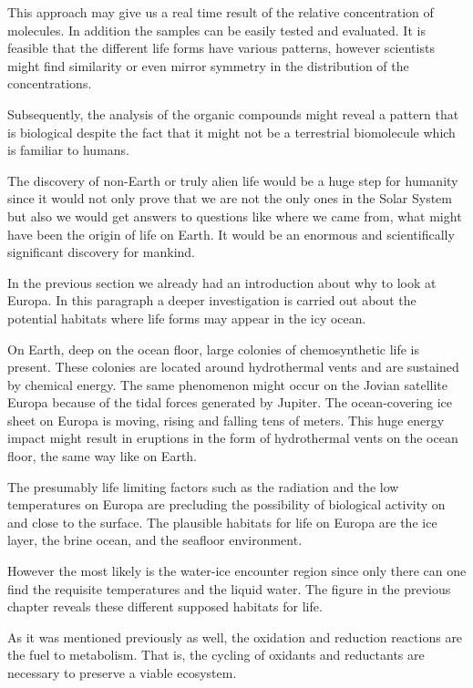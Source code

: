 This approach may give us a real time result of the relative concentration of molecules. In addition the samples can be easily tested and evaluated. 
It is feasible that the different life forms have various patterns, however scientists might find similarity or even mirror symmetry in the distribution of the concentrations. 

Subsequently, the analysis of the organic compounds might reveal a pattern that is biological despite the fact that it might not be a terrestrial biomolecule which is familiar to humans.

The discovery of non-Earth or truly alien life would be a huge step for humanity since it would not only prove that we are not the only ones in the Solar System but also we would get answers to questions like where we came from, what might have been the origin of life on Earth. It would be an enormous and scientifically significant discovery for mankind.

In the previous section we already had an introduction about why to look at Europa. In this paragraph a deeper investigation is carried out about the potential habitats where life forms may appear in the icy ocean.

On Earth, deep on the ocean floor, large colonies of chemosynthetic life is present. These colonies are located around hydrothermal vents and are sustained by chemical energy. 
The same phenomenon might occur on the Jovian satellite Europa because of the tidal forces generated by Jupiter. The ocean-covering ice sheet on Europa is moving, rising and falling tens of meters. This huge energy impact might result in eruptions in the form of hydrothermal vents on the ocean floor, the same way like on Earth.

The presumably life limiting factors such as the radiation and the low temperatures on Europa are precluding the possibility of biological activity on and close to the surface. The plausible habitats for life on Europa are the ice layer, the brine ocean, and the seafloor environment.

However the most likely is the water-ice encounter region since only there can one find  the requisite temperatures and the liquid water.
The figure in the previous chapter reveals these different supposed habitats for life.
\cite{SearchLife}



As it was mentioned previously as well, the oxidation and reduction reactions are the fuel to metabolism. That is, the cycling of oxidants and reductants are necessary to preserve a viable ecosystem.

